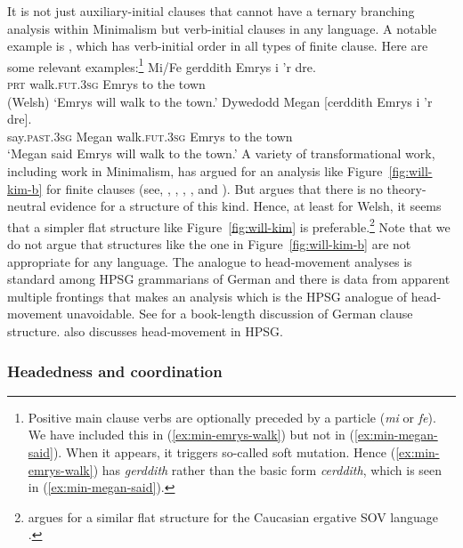 \documentclass[output=paper
                ,modfonts
                ,nonflat
	        ,collection
	        ,collectionchapter
	        ,collectiontoclongg
 	        ,biblatex
                ,babelshorthands
                ,newtxmath
                ,draftmode
                ,colorlinks, citecolor=brown
]{./langsci/langscibook}
\begin{document}
It is not just  auxiliary-initial clauses that cannot have a ternary branching analysis
within Minimalism but verb-initial clauses in any language. A notable example is , which
has verb-initial order in all types of finite clause. Here are some relevant examples:\footnote{%
	Positive main clause verbs are optionally preceded by a particle (\emph{mi} or \emph{fe}). We have included this in (\ref{ex:min-emrys-walk}) but not in (\ref{ex:min-megan-said}). When it appears, it triggers so-called soft mutation. Hence (\ref{ex:min-emrys-walk}) has \emph{gerddith} rather than the basic form \emph{cerddith}, which is seen in (\ref{ex:min-megan-said}).
}
\eal
\ex\label{ex:min-emrys-walk}
\gll Mi/Fe gerddith Emrys i 'r dre.\\
     \textsc{prt} walk.\textsc{fut}.\textsc{3sg} Emrys to the town\\\hfill(Welsh)
\glt `Emrys will walk to the town.'
\ex\label{ex:min-megan-said}
\gll Dywedodd Megan [cerddith Emrys i 'r dre].\\
     say.\textsc{past}.\textsc{3sg} Megan \spacebr{}walk.\textsc{fut}.\textsc{3sg} Emrys to the town\\
\glt `Megan said Emrys will walk to the town.'
\zl
A variety of transformational work, including work in Minimalism, has argued for an analysis like Figure~\ref{fig:will-kim-b} for  finite clauses (see, \eg \citealt{JonesThomas.1977}, \citealt{Sproat.1985}, \citealt{Sadler.1988}, \citealt{Rouveret.1994}, and \citealt{Roberts.2005}). But \citet{Borsley.2006b} argues that there is no theory-neutral evidence for a structure of this kind. Hence, at least for Welsh, it seems that a simpler flat structure like Figure~\ref{fig:will-kim} is preferable.\footnote{%
	\citet{Borsley.2016} argues for a similar flat structure for the Caucasian ergative SOV language .%
} Note that we do not argue that structures like the one in Figure~\ref{fig:will-kim-b} are not
appropriate for any language. The analogue to head-movement analyses is standard among HPSG grammarians of German and there is data from apparent multiple
frontings that makes an analysis which is the HPSG analogue of head-movement unavoidable. See  for a
book-length discussion of German clause structure.  also discusses
head-movement in HPSG.


\subsubsection{Headedness and coordination}
\label{sec-coordination-minimalism}
\end{document}

